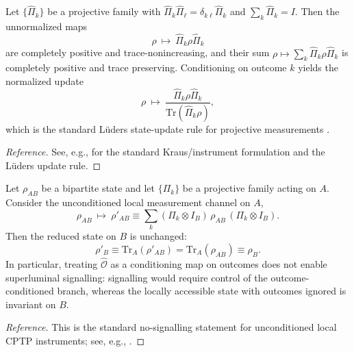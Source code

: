 \begin{proposition}
\label{prop:luders_kraus_instrument}
Let $\{\hat{\Pi}_k\}$ be a projective family with $\hat{\Pi}_k\hat{\Pi}_\ell=\delta_{k\ell}\hat{\Pi}_k$ and $\sum_k \hat{\Pi}_k=I$. Then the unnormalized maps
\begin{equation}
    \rho\ \mapsto\ \hat{\Pi}_k\rho\hat{\Pi}_k
\end{equation}
are completely positive and trace-nonincreasing, and their sum $\rho\mapsto \sum_k \hat{\Pi}_k\rho\hat{\Pi}_k$ is completely positive and trace preserving. Conditioning on outcome $k$ yields the normalized update
\begin{equation}
    \rho\ \mapsto\ \frac{\hat{\Pi}_k\rho\hat{\Pi}_k}{\mathrm{Tr}(\hat{\Pi}_k\rho)},
\end{equation}
which is the standard L{\"u}ders state-update rule for projective measurements \cite{Luders1951,Kraus1983,NielsenChuang2000}.
\end{proposition}
\begin{proof}[Reference]
See, e.g., \cite{Kraus1983,NielsenChuang2000} for the standard Kraus/instrument formulation and the L{\"u}ders update rule.
\end{proof}

\begin{corollary}
\label{cor:nosignalling_luders}
Let $\rho_{AB}$ be a bipartite state and let $\{\Pi_k\}$ be a projective family acting on $A$. Consider the unconditioned local measurement channel on $A$,
\begin{equation}
    \rho_{AB}\ \mapsto\ \rho'_{AB}\equiv \sum_k (\Pi_k\otimes I_B)\,\rho_{AB}\,(\Pi_k\otimes I_B).
\end{equation}
Then the reduced state on $B$ is unchanged:
\begin{equation}
    \rho'_B \equiv \mathrm{Tr}_A(\rho'_{AB})=\mathrm{Tr}_A(\rho_{AB})\equiv \rho_B.
\end{equation}
In particular, treating $\hat{\mathcal{O}}$ as a conditioning map on outcomes does not enable superluminal signalling: signalling would require control of the outcome-conditioned branch, whereas the locally accessible state with outcomes ignored is invariant on $B$.
\end{corollary}
\begin{proof}[Reference]
This is the standard no-signalling statement for unconditioned local CPTP instruments; see, e.g., \cite{NielsenChuang2000}.
\end{proof}

